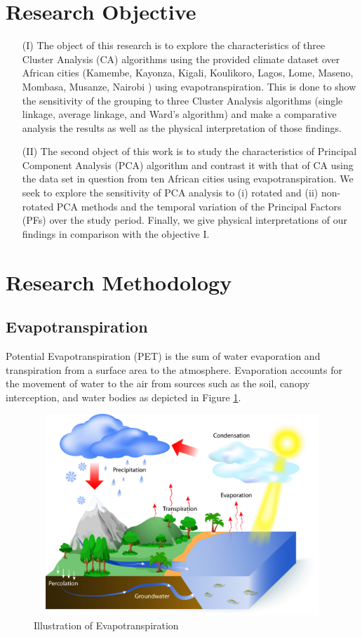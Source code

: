\documentclass[12pt,a4paper]{article}
\begin{document}
\section{Research Objective}
\begin{enumerate}
\item[(I)] The object of this research is to explore the characteristics of three Cluster Analysis (CA) algorithms using the provided climate dataset over African cities (Kamembe, Kayonza, Kigali, Koulikoro, Lagos, Lome, Maseno, Mombasa, Musanze, Nairobi ) using evapotranspiration.  
This is done to show the sensitivity of the grouping to three Cluster Analysis algorithms (single linkage, average linkage,  and Ward’s algorithm) and make a comparative analysis the results as well as the physical interpretation of those findings.
\item[(II)] The second object of this work is to study the characteristics of Principal Component Analysis (PCA) algorithm and contrast it with that of CA using the data set in question from ten African cities using evapotranspiration.  We seek to explore the sensitivity
of PCA analysis to (i) rotated and (ii) non-rotated PCA methods and the temporal variation of the  Principal Factors (PFs) over the study period.  Finally,  we give physical interpretations of our findings in comparison with the objective I.
\end{enumerate}
\section{Research Methodology}
\subsection{Evapotranspiration}
Potential Evapotranspiration (PET) is the sum of water evaporation and transpiration from a surface area to the atmosphere.  Evaporation accounts for the movement of water to the air from sources such as the soil, canopy interception, and water bodies as depicted in Figure \ref{fig:evapo}.
\begin{figure}[!h]
			\includegraphics[width=430pt,  height=215pt]{./gaphics/evapotranspiration.jpg}
			\caption{Illustration of Evapotranspiration}
			\label{fig:evapo}
\end{figure}
\end{document}
